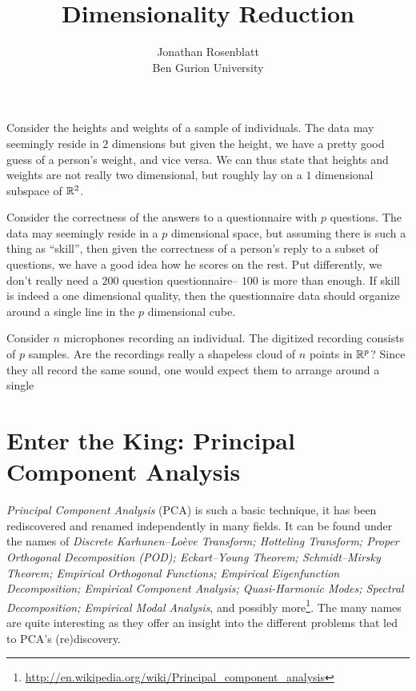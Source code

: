 \documentclass[12pt,a4paper]{article}
\author{Jonathan Rosenblatt \\ Ben Gurion University}
\title{Dimensionality Reduction}
\begin{document}
\maketitle

\tableofcontents

\hrulefill

\begin{example}[BMI]
	\label{ex:bmi}
	Consider the heights and weights of a sample of individuals. 
	The data may seemingly reside in $2$ dimensions but given the height, we have a pretty good guess of a person's weight, and vice versa. 
	We can thus state that heights and weights are not really two dimensional, but roughly lay on a $1$ dimensional subspace of $\mathbb{R}^2$. 
\end{example}


\begin{example}[IQ]
	\label{ex:iq}
	Consider the correctness of the answers to a questionnaire with $p$ questions. 
	The data may seemingly reside in a $p$ dimensional space, but assuming there is such a thing as ``skill'', then given the correctness of a person's reply to a subset of questions, we have a good idea how he scores on the rest. 
	Put differently, we don't really need a $200$ question questionnaire-- $100$ is more than enough.
	If skill is indeed a one dimensional quality, then the questionnaire data should organize around a single line in the $p$ dimensional cube. 
\end{example}


\begin{example}
	\label{ex:blind-signal}
	Consider $n$ microphones recording an individual. 
	The digitized recording consists of $p$ samples. 
	Are the recordings really a shapeless cloud of $n$ points in $\mathbb{R}^p$?
	Since they all record the same sound, one would expect them to arrange around a single 
\end{example}
		
	






\section{Enter the King: Principal Component Analysis}
\label{sec:pca}

\emph{Principal Component Analysis} (PCA) is such a basic technique, it has been rediscovered and renamed independently in many fields. 
It can be found under the names of 
\emph{
	Discrete Karhunen–Loève Transform; 
	Hotteling Transform; 
	Proper Orthogonal Decomposition (POD); 
	Eckart–Young Theorem; 
	Schmidt–Mirsky Theorem;  
	Empirical Orthogonal Functions; 
	Empirical Eigenfunction Decomposition;  
	Empirical Component Analysis;  
	Quasi-Harmonic Modes;  
	Spectral Decomposition;  
	Empirical Modal Analysis}, 
and possibly more\footnote{\url{http://en.wikipedia.org/wiki/Principal_component_analysis} }.
The many names are quite interesting as they offer an insight into the different problems that led to PCA's (re)discovery.
\end{document}
